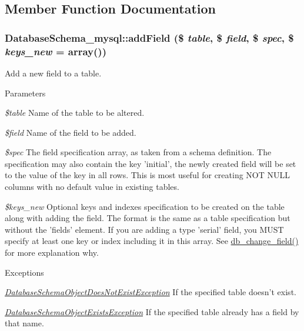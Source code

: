 \subsection{Member Function Documentation}
\hypertarget{classDatabaseSchema__mysql_ae30b5689e92ccfc88f2dc2b7964d0234}{
\subsubsection[{addField}]{\setlength{\rightskip}{0pt plus 5cm}DatabaseSchema\_\-mysql::addField (\$ {\em table}, \/  \$ {\em field}, \/  \$ {\em spec}, \/  \$ {\em keys\_\-new} = {\ttfamily array()})}}
\label{classDatabaseSchema__mysql_ae30b5689e92ccfc88f2dc2b7964d0234}
Add a new field to a table.


\begin{DoxyParams}{Parameters}
\item[{\em \$table}]Name of the table to be altered. \item[{\em \$field}]Name of the field to be added. \item[{\em \$spec}]The field specification array, as taken from a schema definition. The specification may also contain the key 'initial', the newly created field will be set to the value of the key in all rows. This is most useful for creating NOT NULL columns with no default value in existing tables. \item[{\em \$keys\_\-new}]Optional keys and indexes specification to be created on the table along with adding the field. The format is the same as a table specification but without the 'fields' element. If you are adding a type 'serial' field, you MUST specify at least one key or index including it in this array. See \hyperlink{group__schemaapi_ga9e0a4211eb8137e187d5f3f4fa716cea}{db\_\-change\_\-field()} for more explanation why.\end{DoxyParams}

\begin{DoxyExceptions}{Exceptions}
\item[{\em \hyperlink{classDatabaseSchemaObjectDoesNotExistException}{DatabaseSchemaObjectDoesNotExistException}}]If the specified table doesn't exist. \item[{\em \hyperlink{classDatabaseSchemaObjectExistsException}{DatabaseSchemaObjectExistsException}}]If the specified table already has a field by that name. \end{DoxyExceptions}


